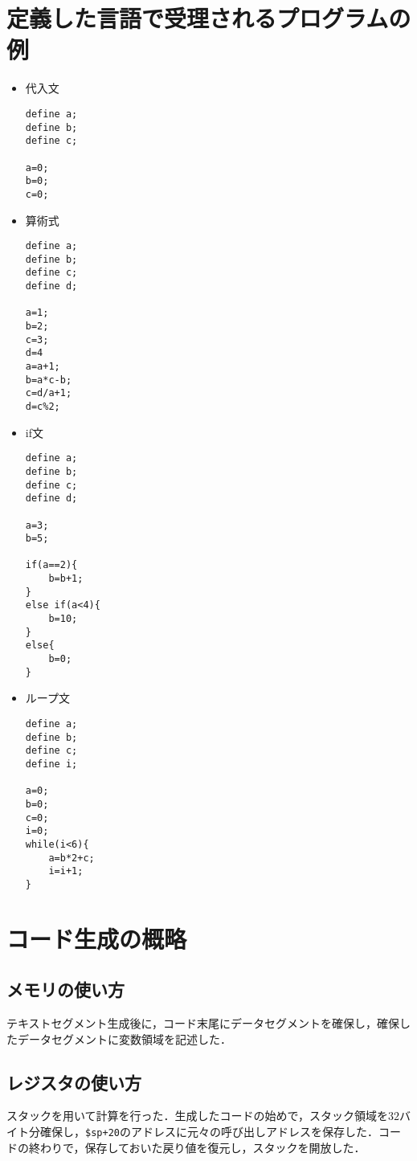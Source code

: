 \documentclass{jarticle}[11pt]
\begin{document}
\section{定義した言語で受理されるプログラムの例}
\begin{itemize}
\item 代入文
\begin{verbatim}
define a;
define b;
define c;

a=0; 
b=0;
c=0;
\end{verbatim}

\item 算術式
\begin{verbatim}
define a;
define b;
define c;
define d;

a=1; 
b=2;
c=3;
d=4
a=a+1;
b=a*c-b;
c=d/a+1;
d=c%2;
\end{verbatim}

\item if文
\begin{verbatim}
define a;
define b;
define c;
define d;

a=3; 
b=5;

if(a==2){
    b=b+1;
}
else if(a<4){
    b=10;
}
else{
    b=0;
}
\end{verbatim}

\item ループ文
\begin{verbatim}
define a;
define b;
define c;
define i;

a=0; 
b=0;
c=0;
i=0;
while(i<6){
    a=b*2+c;
    i=i+1;
}
\end{verbatim}
\end{itemize}

\section{コード生成の概略}
\subsection{メモリの使い方}
テキストセグメント生成後に，コード末尾にデータセグメントを確保し，確保したデータセグメントに変数領域を記述した．
\subsection{レジスタの使い方}
スタックを用いて計算を行った．生成したコードの始めで，スタック領域を$32$バイト分確保し，\verb|$sp+20|のアドレスに元々の呼び出しアドレスを保存した．コードの終わりで，保存しておいた戻り値を復元し，スタックを開放した．
\end{document}

